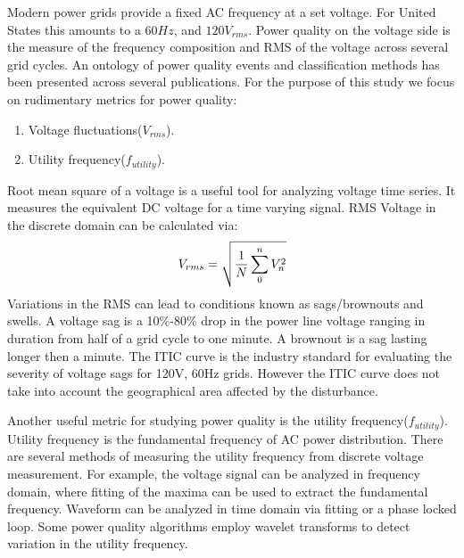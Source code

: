 Modern power grids provide a fixed AC frequency at a set voltage. For United States this amounts to a $60Hz$, and $120V_{rms}$. Power quality on the voltage side is the  measure of the frequency composition and RMS of the voltage across several grid cycles. An ontology of power quality events and classification methods has been presented across several publications.\cite{pq_onto1} \cite{pq_class} For the purpose of this study we focus on rudimentary metrics for power quality:

\begin{enumerate}
\item Voltage fluctuations($V_{rms}$).
\item Utility frequency($f_{utility}$).
\end{enumerate}

Root mean square of a voltage is a useful tool for analyzing voltage time series. It measures the equivalent DC voltage for a time varying signal. RMS Voltage in the discrete domain can be calculated via:
\begin{equation}
\label{eq:rms}
\centering
V_{rms} = \sqrt{\frac{1}{N} \sum_{0}^{n}{V_{n}^2}}
\end{equation}
Variations in the RMS can lead to conditions known as sags/brownouts and swells. A voltage sag is a 10\%-80\% drop in the power line voltage ranging in duration from half of a grid cycle to one minute. A brownout is a sag lasting longer then a minute. The ITIC curve is the industry standard for evaluating the severity of voltage sags for 120V, 60Hz grids. However the ITIC curve does not take into account the geographical area affected by the disturbance.

Another useful metric for studying power quality is the utility frequency($f_{utility}$). Utility frequency is the fundamental frequency of AC power distribution. There are several methods of measuring the utility frequency from discrete voltage measurement. For example, the voltage signal can be analyzed in frequency domain, where fitting of the maxima can be used to extract the fundamental frequency. Waveform can be analyzed in time domain via fitting or a phase locked loop. Some power quality algorithms employ wavelet transforms to detect variation in the utility frequency.\cite{pq_class}

